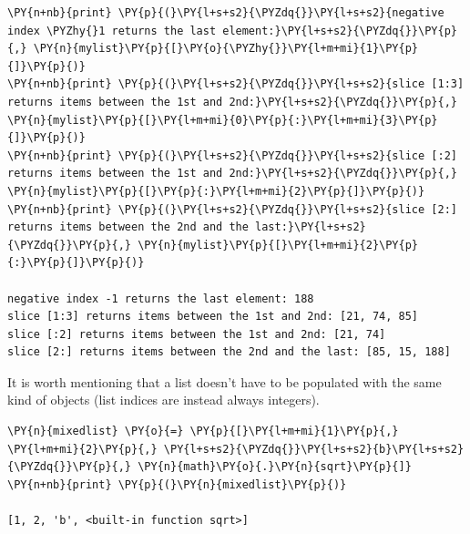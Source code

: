 \begin{tcolorbox}[breakable, size=fbox, boxrule=1pt, pad at break*=1mm, colback=cellbackground, colframe=cellborder]
\begin{Verbatim}[commandchars=\\\{\}]
\PY{n+nb}{print} \PY{p}{(}\PY{l+s+s2}{\PYZdq{}}\PY{l+s+s2}{negative index \PYZhy{}1 returns the last element:}\PY{l+s+s2}{\PYZdq{}}\PY{p}{,} \PY{n}{mylist}\PY{p}{[}\PY{o}{\PYZhy{}}\PY{l+m+mi}{1}\PY{p}{]}\PY{p}{)}
\PY{n+nb}{print} \PY{p}{(}\PY{l+s+s2}{\PYZdq{}}\PY{l+s+s2}{slice [1:3] returns items between the 1st and 2nd:}\PY{l+s+s2}{\PYZdq{}}\PY{p}{,} \PY{n}{mylist}\PY{p}{[}\PY{l+m+mi}{0}\PY{p}{:}\PY{l+m+mi}{3}\PY{p}{]}\PY{p}{)}
\PY{n+nb}{print} \PY{p}{(}\PY{l+s+s2}{\PYZdq{}}\PY{l+s+s2}{slice [:2] returns items between the 1st and 2nd:}\PY{l+s+s2}{\PYZdq{}}\PY{p}{,} \PY{n}{mylist}\PY{p}{[}\PY{p}{:}\PY{l+m+mi}{2}\PY{p}{]}\PY{p}{)}
\PY{n+nb}{print} \PY{p}{(}\PY{l+s+s2}{\PYZdq{}}\PY{l+s+s2}{slice [2:] returns items between the 2nd and the last:}\PY{l+s+s2}{\PYZdq{}}\PY{p}{,} \PY{n}{mylist}\PY{p}{[}\PY{l+m+mi}{2}\PY{p}{:}\PY{p}{]}\PY{p}{)}

negative index -1 returns the last element: 188
slice [1:3] returns items between the 1st and 2nd: [21, 74, 85]
slice [:2] returns items between the 1st and 2nd: [21, 74]
slice [2:] returns items between the 2nd and the last: [85, 15, 188]
\end{Verbatim}
\end{tcolorbox}

It is worth mentioning that a list doesn't have to be populated
with the same kind of objects (list indices are instead always
integers).

\begin{tcolorbox}[breakable, size=fbox, boxrule=1pt, pad at break*=1mm, colback=cellbackground, colframe=cellborder]
\begin{Verbatim}[commandchars=\\\{\}]
\PY{n}{mixedlist} \PY{o}{=} \PY{p}{[}\PY{l+m+mi}{1}\PY{p}{,} \PY{l+m+mi}{2}\PY{p}{,} \PY{l+s+s2}{\PYZdq{}}\PY{l+s+s2}{b}\PY{l+s+s2}{\PYZdq{}}\PY{p}{,} \PY{n}{math}\PY{o}{.}\PY{n}{sqrt}\PY{p}{]}
\PY{n+nb}{print} \PY{p}{(}\PY{n}{mixedlist}\PY{p}{)}

[1, 2, 'b', <built-in function sqrt>]
\end{Verbatim}
\end{tcolorbox}

